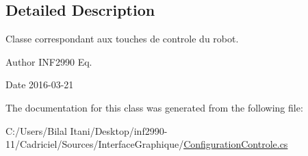 \subsection{Detailed Description}
Classe correspondant aux touches de controle du robot. 

\begin{DoxyAuthor}{Author}
I\+N\+F2990 Eq. 
\end{DoxyAuthor}
\begin{DoxyDate}{Date}
2016-\/03-\/21 
\end{DoxyDate}


The documentation for this class was generated from the following file\+:\begin{DoxyCompactItemize}
\item 
C\+:/\+Users/\+Bilal Itani/\+Desktop/inf2990-\/11/\+Cadriciel/\+Sources/\+Interface\+Graphique/\hyperlink{_configuration_controle_8cs}{Configuration\+Controle.\+cs}\end{DoxyCompactItemize}
